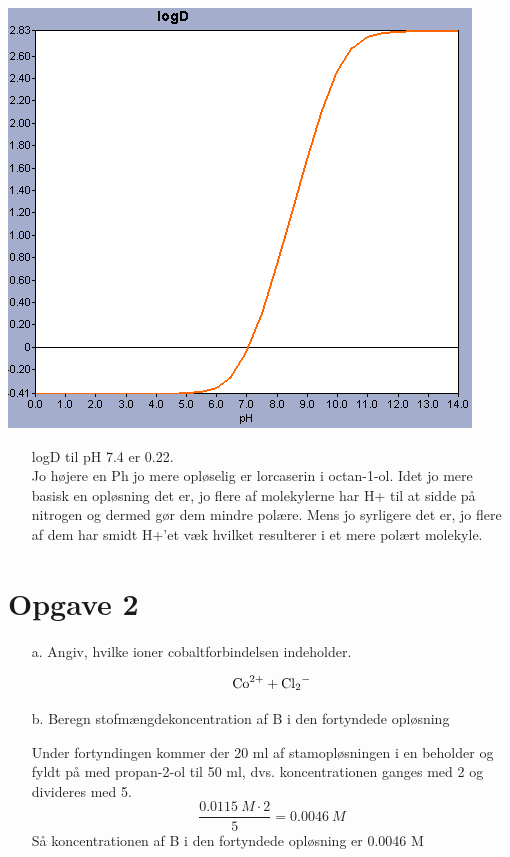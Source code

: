 \documentclass[12pt]{article}
\begin{document}
\includegraphics{logd.png}
\begin{enumerate}
        \item[] logD til pH 7.4 er 0.22.\\
                Jo højere en Ph jo mere opløselig er lorcaserin i octan-1-ol. Idet jo mere basisk en opløsning det er, jo flere af
                molekylerne har H+ til at sidde på nitrogen og dermed gør dem mindre polære. Mens jo syrligere det er, jo flere af
                dem har smidt H+'et væk hvilket resulterer i et mere polært molekyle.
\end{enumerate}

\section*{Opgave 2}

\begin{enumerate}
        \item[a.] Angiv, hvilke ioner cobaltforbindelsen indeholder.

                $$\ce{Co^{2+} + Cl_2^-}$$

        \item[b.] Beregn stofmængdekoncentration af B i den fortyndede opløsning

                Under fortyndingen kommer der 20 ml af stamopløsningen i en beholder og fyldt på med propan-2-ol til 50 ml,
                dvs. koncentrationen ganges med 2 og divideres med 5.
                $$\frac{0.0115 \ M \cdot 2}{5} = 0.0046 \ M$$
                Så koncentrationen af B i den fortyndede opløsning er 0.0046 M
\end{enumerate}
\end{document}
